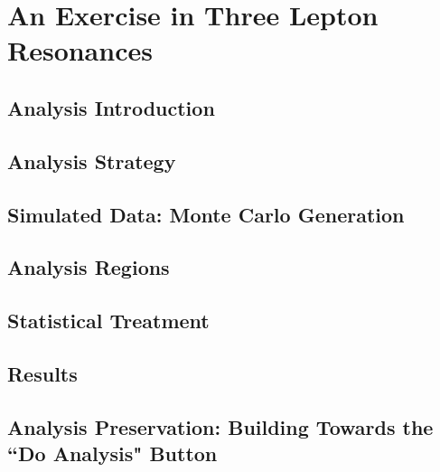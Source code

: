 \chapter[An Exercise in Three Lepton Resonances][An Exercise in Three Lepton Resonances]{An Exercise in Three Lepton Resonances}
\label{ch:rpvthreel}

\section{Analysis Introduction}\label{sec:motivation}


\section{Analysis Strategy}\label{sec:strategy}


\section{Simulated Data: Monte Carlo Generation}\label{sec:MC}


\section{Analysis Regions}\label{sec:regions}


\section{Statistical Treatment}\label{sec:stats}


\section{Results}\label{sec:results}


\section{Analysis Preservation: Building Towards the ``Do Analysis" Button}\label{sec:analysispreservation}
